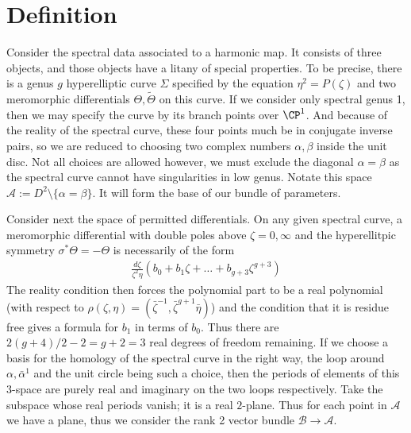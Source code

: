 \documentclass{article}
\begin{document}
\section{Definition}
\label{sec:Definition}
Consider the spectral data associated to a harmonic map. It consists of three objects, and those objects have a litany of special properties. To be precise, there is a genus $g$ hyperelliptic curve $Σ$ specified by the equation $η^2=P(ζ)$ and two meromorphic differentials $Θ, \tilde{Θ}$ on this curve. If we consider only spectral genus 1, then we may specify the curve by its branch points over $\CP^1$. And because of the reality of the spectral curve, these four points much be in conjugate inverse pairs, so we are reduced to choosing two complex numbers $α,β$ inside the unit disc. Not all choices are allowed however, we must exclude the diagonal $α=β$ as the spectral curve cannot have singularities in low genus. Notate this space $\mathcal{A} := D^2 \setminus \{α=β\}$. It will form the base of our bundle of parameters.

Consider next the space of permitted differentials. On any given spectral curve, a meromorphic differential with double poles above $ζ=0,\infty$ and the hyperellitpic symmetry $σ^* Θ = - Θ$ is necessarily of the form
\begin{align}
\frac{dζ}{ζ^2η}\left( b_0 + b_1ζ + \ldots + b_{g+3}ζ^{g+3} \right)
\end{align}
The reality condition then forces the polynomial part to be a real polynomial (with respect to $ρ(ζ,η) = (\bar{ζ}^{-1}, \bar{ζ}^{g+1}\bar{η})$) and the condition that it is residue free gives a formula for $b_1$ in terms of $b_0$. Thus there are $2(g+4)/2-2 = g+2=3$ real degrees of freedom remaining. If we choose a basis for the homology of the spectral curve in the right way, the loop around $α,\bar{α}^1$ and the unit circle being such a choice, then the periods of elements of this $3$-space are purely real and imaginary on the two loops respectively. Take the subspace whose real periods vanish; it is a real $2$-plane. Thus for each point in $\mathcal{A}$ we have a plane, thus we consider the rank 2 vector bundle $\mathcal{B}\to\mathcal{A}$.
\end{document}
